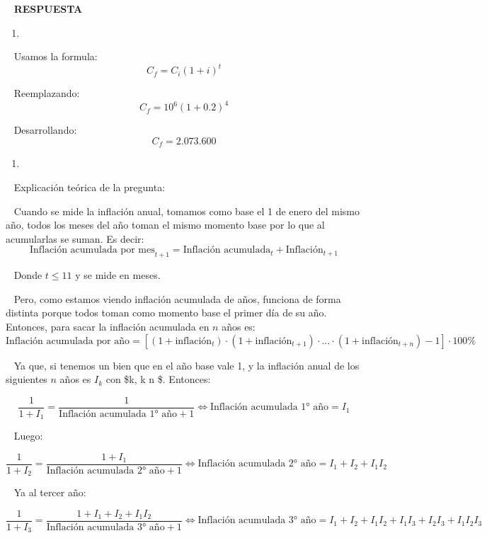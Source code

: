 \documentclass[
  letterpaper,
  DIV=11,
  numbers=noendperiod]{scrreport}
\providecommand{\tightlist}{%
  \setlength{\itemsep}{0pt}\setlength{\parskip}{0pt}}\usepackage{longtable,booktabs,array}
\begin{document}
~ \textbf{RESPUESTA}

\begin{enumerate}
\def\labelenumi{\arabic{enumi})}
\tightlist
\item
\end{enumerate}

~ Usamos la formula: \[
C_f=C_i(1+i)^t
\]

~ Reemplazando: \[
C_f=10^6(1+0.2)^4
\]

~ Desarrollando: \[
C_f=\text{$2$.$073$.$600$}
\]

\hfill\break

\begin{enumerate}
\def\labelenumi{\arabic{enumi})}
\setcounter{enumi}{1}
\tightlist
\item
\end{enumerate}

\hfill\break

~ Explicación teórica de la pregunta:

\hfill\break

~ Cuando se mide la inflación anual, tomamos como base el 1 de enero del
mismo año, todos los meses del año toman el mismo momento base por lo
que al acumularlas se suman. Es decir: \[
\text{Inflación acumulada por mes}_{t+1}=\text{Inflación acumulada}_{t}+\text{Inflación}_{t+1}
\]

~ Donde \(t\leq 11\) y se mide en meses.

~ Pero, como estamos viendo inflación acumulada de años, funciona de
forma distinta porque todos toman como momento base el primer día de su
año. Entonces, para sacar la inflación acumulada en \(n\) años es: \[
\text{Inflación acumulada por año}=\left[(1+\text{inflación}_t)\cdot(1+\text{inflación}_{t+1})\cdot ... \cdot (1+\text{inflación}_{t+n})-1\right]\cdot 100\%
\]

~ Ya que, si tenemos un bien que en el año base vale 1, y la inflación
anual de los siguientes \(n\) años es \(I_k\) con \$k\in {}, k
\leq n \$. Entonces:

\[
\frac{1}{1+I_1}=\frac{1}{\text{Inflación acumulada 1° año}+1} \Leftrightarrow \text{Inflación acumulada 1° año}=I_1
\]

~ Luego:

\[
\frac{1}{1+I_2}=\frac{1+I_1}{\text{Inflación acumulada 2° año}+1} \Leftrightarrow \text{Inflación acumulada 2° año}=I_1+I_2+I_1I_2
\]

~ Ya al tercer año:

\[
\frac{1}{1+I_3}=\frac{1+I_1+I_2+I_1I_2}{\text{Inflación acumulada 3° año}+1} \Leftrightarrow \text{Inflación acumulada 3° año}=I_1+I_2+I_1I_2+I_1I_3+I_2I_3+I_1I_2I_3
\]
\end{document}
